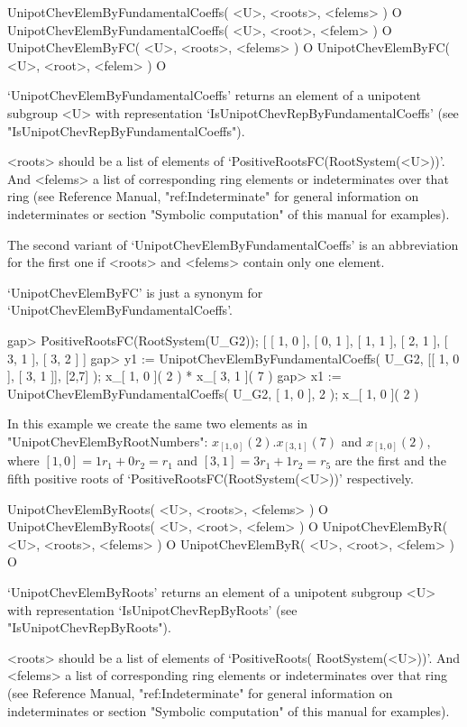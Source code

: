 \>UnipotChevElemByFundamentalCoeffs( <U>, <roots>, <felems> ) O
\>UnipotChevElemByFundamentalCoeffs( <U>, <root>, <felem> ) O
\>UnipotChevElemByFC( <U>, <roots>, <felems> ) O
\>UnipotChevElemByFC( <U>, <root>, <felem> ) O

`UnipotChevElemByFundamentalCoeffs'  returns  an  element  of a unipotent
subgroup  <U>  with  representation  `IsUnipotChevRepByFundamentalCoeffs'
(see "IsUnipotChevRepByFundamentalCoeffs").

<roots>      should      be      a     list      of      elements      of
`PositiveRootsFC(Root\-System(<U>))'.   And   <felems>    a    list    of
corresponding ring elements or indeterminates over that ring  (see {\GAP}
Reference   Manual,   "ref:Indeterminate"  for  general   information  on
indeterminates  or  section  "Symbolic computation"  of  this  manual for
examples).

The   second   variant  of   `UnipotChevElemByFundamentalCoeffs'   is  an
abbreviation for  the first one if <roots> and  <felems> contain only one
element.

`UnipotChevElemByFC'       is       just       a        synonym       for
`UnipotChevElemByFundamentalCoeffs'.

\beginexample
gap> PositiveRootsFC(RootSystem(U_G2));
[ [ 1, 0 ], [ 0, 1 ], [ 1, 1 ], [ 2, 1 ], [ 3, 1 ], [ 3, 2 ] ]
gap> y1 := UnipotChevElemByFundamentalCoeffs( U_G2, [[ 1, 0 ], [ 3, 1 ]], [2,7] );
x_{[ 1, 0 ]}( 2 ) * x_{[ 3, 1 ]}( 7 )
gap> x1 := UnipotChevElemByFundamentalCoeffs( U_G2, [ 1, 0 ], 2 );
x_{[ 1, 0 ]}( 2 )
\endexample

In   this   example   we   create   the   same   two   elements   as   in
"UnipotChevElemByRootNumbers": $x_{[  1, 0 ]}( 2  ) . x_{[ 3, 1 ]}( 7  )$
and $x_{[ 1, 0 ]}( 2 )$, where $[ 1, 0 ] = 1r_1 + 0r_2 = r_1$ and $[ 3, 1
]  = 3r_1 + 1r_2=r_5$  are  the  first  and the  fifth  positive roots of
`PositiveRootsFC(RootSystem(<U>))' respectively.


\>UnipotChevElemByRoots( <U>, <roots>, <felems> ) O
\>UnipotChevElemByRoots( <U>, <root>, <felem> ) O
\>UnipotChevElemByR( <U>, <roots>, <felems> ) O
\>UnipotChevElemByR( <U>, <root>, <felem> ) O

`UnipotChevElemByRoots' returns  an element of  a unipotent  subgroup <U>
with         representation        `IsUnipotChev\-RepByRoots'        (see
"IsUnipotChevRepByRoots").

<roots>   should   be   a    list   of   elements   of   `PositiveRoots(%
Root\-System(<U>))'. And  <felems> a list of  corresponding ring elements
or  indeterminates  over   that   ring  (see   {\GAP}  Reference  Manual,
"ref:Indeterminate" for general information on indeterminates or  section
"Symbolic computation" of this manual for examples).


